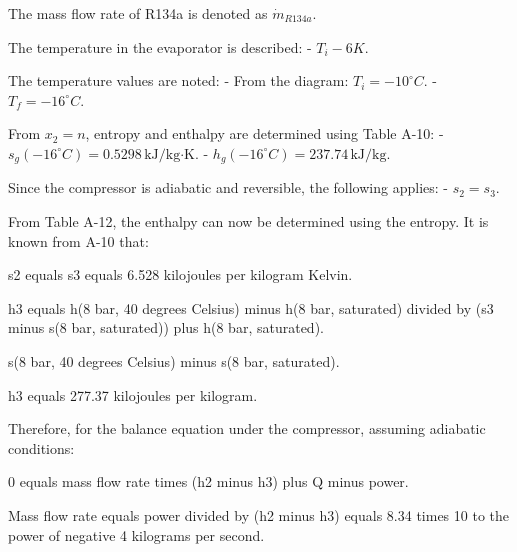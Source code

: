 The mass flow rate of R134a is denoted as \( \dot{m}_{R134a} \).  

The temperature in the evaporator is described:  
- \( T_i - 6K \).  

The temperature values are noted:  
- From the diagram: \( T_i = -10^\circ C \).  
- \( T_f = -16^\circ C \).  

From \( x_2 = n \), entropy and enthalpy are determined using Table A-10:  
- \( s_g(-16^\circ C) = 0.5298 \, \text{kJ/kg·K} \).  
- \( h_g(-16^\circ C) = 237.74 \, \text{kJ/kg} \).  

Since the compressor is adiabatic and reversible, the following applies:  
- \( s_2 = s_3 \).

From Table A-12, the enthalpy can now be determined using the entropy. It is known from A-10 that:

s2 equals s3 equals 6.528 kilojoules per kilogram Kelvin.

h3 equals h(8 bar, 40 degrees Celsius) minus h(8 bar, saturated) divided by (s3 minus s(8 bar, saturated)) plus h(8 bar, saturated).

s(8 bar, 40 degrees Celsius) minus s(8 bar, saturated).

h3 equals 277.37 kilojoules per kilogram.

Therefore, for the balance equation under the compressor, assuming adiabatic conditions:

0 equals mass flow rate times (h2 minus h3) plus Q minus power.

Mass flow rate equals power divided by (h2 minus h3) equals 8.34 times 10 to the power of negative 4 kilograms per second.